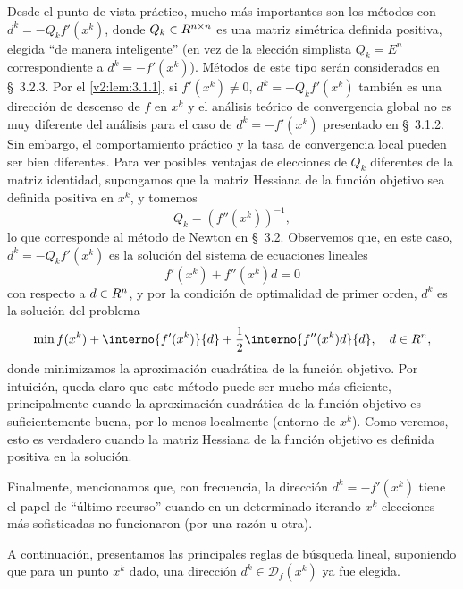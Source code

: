 Desde el punto de vista práctico, mucho más importantes son los métodos con $d^k = -Q_k f'(x^k)$, donde $Q_k \in R^{n \times n}$ es una matriz simétrica definida positiva, elegida ``de manera inteligente'' (en vez de la elección simplista $Q_k = E^n$ correspondiente a $d^k = -f'(x^k)$). Métodos de este tipo serán considerados en \S~3.2.3. Por el \cref{v2:lem:3.1.1}, si $f'(x^k) \neq 0$, $d^k = -Q_k f'(x^k)$ también es una dirección de descenso de $f$ en $x^k$ y el análisis teórico de convergencia global no es muy diferente del análisis para el caso de $d^k = -f'(x^k)$ presentado en \S~3.1.2. Sin embargo, el comportamiento práctico y la tasa de convergencia local pueden ser bien diferentes. Para ver posibles ventajas de elecciones de $Q_k$ diferentes de la matriz identidad, supongamos que la matriz Hessiana de la función objetivo sea definida positiva en $x^k$, y tomemos
\[
    Q_k = (f''(x^k))^{-1},
\]
lo que corresponde al método de Newton en \S~3.2. Observemos que, en este caso, $d^k = -Q_k f'(x^k)$ es la solución del sistema de ecuaciones lineales
\[
    f'(x^k) + f''(x^k)d = 0
\]
con respecto a $d \in R^n$, y por la condición de optimalidad de primer orden, $d^k$ es la solución del problema
\[
    \min f(x^k) + \interno{f'(x^k)}{d} + \frac{1}{2} \interno{f''(x^k)d}{d}, \quad d \in \Rn,
\]
donde minimizamos la aproximación cuadrática de la función objetivo. Por intuición, queda claro que este método puede ser mucho más eficiente, principalmente cuando la aproximación cuadrática de la función objetivo es suficientemente buena, por lo menos localmente (entorno de $x^k$). Como veremos, esto es verdadero cuando la matriz Hessiana de la función objetivo es definida positiva en la solución.

Finalmente, mencionamos que, con frecuencia, la dirección $d^k = -f'(x^k)$ tiene el papel de ``último recurso'' cuando en un determinado iterando $x^k$ elecciones más sofisticadas no funcionaron (por una razón u otra).

A continuación, presentamos las principales reglas de búsqueda lineal, suponiendo que para un punto $x^k$ dado, una dirección $d^k \in \mathcal{D}_f(x^k)$ ya fue elegida.

